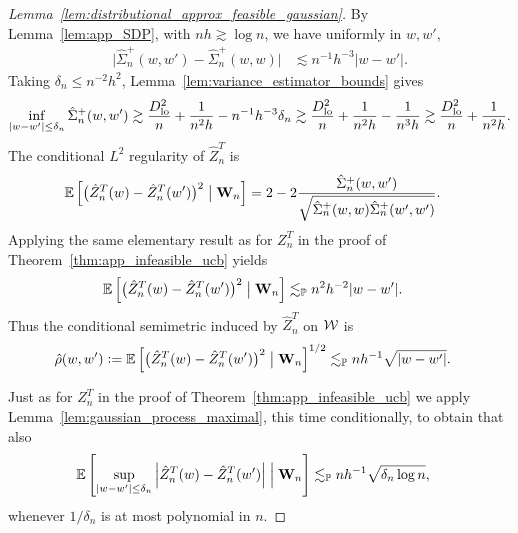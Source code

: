 \begin{proof}[Lemma~\ref{lem:distributional_approx_feasible_gaussian}]
  By Lemma~\ref{lem:app_SDP},
  with $nh \gtrsim \log n$,
  we have
  uniformly in $w,w'$,
  \begin{align*}
    \big|
    \hat \Sigma_n^+(w,w')
    - \hat \Sigma_n^+(w,w)
    \big|
    &\lesssim
    n^{-1} h^{-3} |w-w'|.
  \end{align*}
  Taking
  $\delta_n \leq n^{-2} h^2$,
  Lemma~\ref{lem:variance_estimator_bounds}
  gives
  \begin{align*}
    \inf_{|w-w'| \leq \delta_n}
    \hat \Sigma_n^+(w,w')
    \gtrsim
    \frac{D_{\textup{lo}}^2}{n}
    + \frac{1}{n^2h}
    - n^{-1} h^{-3} \delta_n
    \gtrsim
    \frac{D_{\textup{lo}}^2}{n}
    + \frac{1}{n^2h}
    - \frac{1}{n^3h}
    \gtrsim
    \frac{D_{\textup{lo}}^2}{n}
    + \frac{1}{n^2h}.
  \end{align*}
  The conditional $L^2$
  regularity of $\hat Z_n^T$ is
  \begin{align*}
    \mathbb{E}\left[
      \big(
      \hat Z_n^T(w) - \hat Z_n^T(w')
      \big)^2
      \bigm\vert \mathbf{W}_n
    \right]
    &=
    2 - 2
    \frac{\hat \Sigma_n^+(w,w')}
    {\sqrt{\hat \Sigma_n^+(w,w) \hat \Sigma_n^+(w',w')}}.
  \end{align*}
  Applying the same elementary result as for $Z_n^T$
  in the proof of Theorem~\ref{thm:app_infeasible_ucb} yields
  \begin{align*}
    \mathbb{E}\left[
      \big(
      \hat Z_n^T(w) - \hat Z_n^T(w')
      \big)^2
      \bigm\vert \mathbf{W}_n
    \right]
    &\lesssim_{\mathbb{P}}
    n^2 h^{-2} |w-w'|.
  \end{align*}
  Thus the conditional semimetric
  induced by $\hat Z_n^T$ on $\mathcal{W}$ is
  \begin{align*}
    \hat\rho(w,w')
    &\vcentcolon=
    \mathbb{E}\left[
      \big(
      \hat Z_n^T(w) - \hat Z_n^T(w')
      \big)^2
      \bigm\vert \mathbf{W}_n
    \right]^{1/2}
    \lesssim_{\mathbb{P}}
    n h^{-1} \sqrt{|w-w'|}.
  \end{align*}


  Just as for $Z_n^T$
  in the proof of Theorem~\ref{thm:app_infeasible_ucb}
  we apply Lemma~\ref{lem:gaussian_process_maximal},
  this time conditionally,
  to obtain that also
  \begin{align*}
    \mathbb{E}\left[
      \sup_{|w-w'| \leq \delta_n}
      \left| \hat Z_n^T(w) - \hat Z_n^T(w') \right|
      \Bigm\vert \mathbf{W}_n
    \right]
    &\lesssim_{\mathbb{P}}
    n h^{-1}
    \sqrt{\delta_n \log n},
  \end{align*}
  whenever $1/\delta_n$
  is at most polynomial in $n$.


\end{proof}

